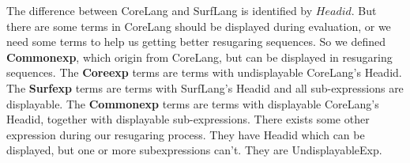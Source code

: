 \begin{centering}
	\framebox[38em][c]{
		\parbox[t]{38em}{
			\[
			\begin{array}{rcl}
			\mbox{Exp} &::=& \mbox{DisplayableExp}\\
			&|& \mbox{UndisplayableExp}\\
			\end{array}
			\]
			\[
			\begin{array}{rcl}
			\mbox{DisplayableExp} &::=& \mbox{Surfexp}\\
			&|& \mbox{Commonexp}
			\end{array}
			\]

			\[
			\begin{array}{rcl}
			\mbox{UndisplayableExp} &::=& \mbox{Coreexp}\\
			&|& \mbox{OtherSurfexp}\\
			&|& \mbox{OtherCommonexp}
			\end{array}
			\]
			
			\[
			\begin{array}{rcl}
			\mbox{Coreexp} &::=& (\mbox{CoreHead}~\mbox{Exp}*)
			\end{array}
			\]
			
			\[
			\begin{array}{rcl}
			\mbox{Surfexp} &::=& (\mbox{SurfHead}~\mbox{DisplayableExp}*)
			\end{array}
			\]
			
			\[
			\begin{array}{rcl}
			\mbox{Commonexp} &::=& (\mbox{CommonHead}~\mbox{DisplayableExp}*)\\
			&|& \mbox{Value}\\
			&|& \mbox{Variable}
			\end{array}
			\]
			
			\[
			\begin{array}{rcl}
			\mbox{OtherSurfexp} &::=& (\mbox{SurfHead}~\mbox{Exp}*~\mbox{UndisplayableExp}~\mbox{Exp}*)
			\end{array}
			\]
			
			\[
			\begin{array}{rcl}
			\mbox{OtherCommonexp} &::=& (\mbox{CommonHead}~\mbox{Exp}*~\mbox{UndisplayableExp}~\mbox{Exp}*)
			\end{array}
			\]
		}
	}
\end{centering}

The difference between CoreLang and SurfLang is identified by $Headid$. But there are some terms in CoreLang should be displayed during evaluation, or we need some terms to help us getting better resugaring sequences. So we defined {\bfseries Commonexp}, which origin from CoreLang, but can be displayed in resugaring sequences. The {\bfseries Coreexp} terms are terms with undisplayable CoreLang's Headid. The {\bfseries Surfexp} terms are terms with SurfLang's Headid and all sub-expressions are displayable. The {\bfseries Commonexp} terms are terms with displayable CoreLang's Headid, together with displayable sub-expressions. There exists some other expression during our resugaring process. They have Headid which can be displayed, but one or more subexpressions can't. They are UndisplayableExp.

